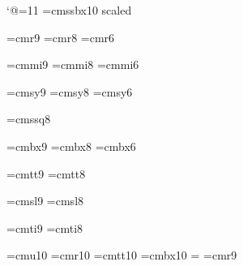 \catcode`@=11
\font\titlefont=cmssbx10 scaled 

\font\ninerm=cmr9
\font\eightrm=cmr8
\font\sixrm=cmr6

\font\ninei=cmmi9
\font\eighti=cmmi8
\font\sixi=cmmi6

\font\ninesy=cmsy9
\font\eightsy=cmsy8
\font\sixsy=cmsy6

\font\eightss=cmssq8


\font\ninebf=cmbx9
\font\eightbf=cmbx8
\font\sixbf=cmbx6

\font\ninett=cmtt9
\font\eighttt=cmtt8

\font\ninesl=cmsl9
\font\eightsl=cmsl8

\font\nineit=cmti9
\font\eightit=cmti8

\font\tenu=cmu10 %
\font\tenrm=cmr10
\font\tentt=cmtt10
\let\oldtenbf=\tenbf
\font\tenbf=cmbx10
\let\mainfont=\tenrm
{}=\tenrm
\let\oldninerm=\ninerm
\font\ninerm=cmr9
\newskip\ttglue
\def\tenpoint{\def\rm{\fam0\tenrm}%
  \textfont0=\tenrm \scriptfont0=\sevenrm \scriptscriptfont0=\fiverm
  \textfont1=\teni \scriptfont1=\seveni \scriptscriptfont1=\fivei
  \textfont2=\tensy \scriptfont2=\sevensy \scriptscriptfont2=\fivesy
  \textfont3=\tenex \scriptfont3=\tenex \scriptscriptfont3=\tenex
  \def\it{\fam\itfam\tenit}%
  \textfont\itfam=\tenit
  \def\sl{\fam\slfam\tensl}%
  \textfont\slfam=\tensl
  \def\bf{\fam\bffam\tenbf}%
  \textfont\bffam=\tenbf \scriptfont\bffam=\sevenbf
   \scriptscriptfont\bffam=\fivebf
  \def\tt{\fam\ttfam\tentt}%
  \textfont\ttfam=\tentt
  \tt \ttglue=.5em plus.25em minus.15em
  \normalbaselineskip=12pt
  \let\sc=\eightrm
  \let\big=\tenbig
  \setbox\strutbox=\hbox{\vrule height8.5pt depth3.5pt width\z@}%
  \normalbaselines\rm}
\def\eightpoint{\def\rm{\fam0\eightrm}%
  \textfont0=\eightrm \scriptfont0=\sixrm \scriptscriptfont0=\fiverm
  \textfont1=\eighti \scriptfont1=\sixi \scriptscriptfont1=\fivei
  \textfont2=\eightsy \scriptfont2=\sixsy \scriptscriptfont2=\fivesy
  \textfont3=\tenex \scriptfont3=\tenex \scriptscriptfont3=\tenex
  \def\it{\fam\itfam\eightit}%
  \textfont\itfam=\eightit
  \def\sl{\fam\slfam\eightsl}%
  \textfont\slfam=\eightsl
  \def\bf{\fam\bffam\eightbf}%
  \textfont\bffam=\eightbf \scriptfont\bffam=\sixbf
   \scriptscriptfont\bffam=\fivebf
  \def\tt{\fam\ttfam\eighttt}%
  \textfont\ttfam=\eighttt
  \tt \ttglue=.5em plus.25em minus.15em
  \normalbaselineskip=9pt
  \let\sc=\sixrm
  \let\big=\eightbig
  \setbox\strutbox=\hbox{\vrule height7pt depth2pt width\z@}%
  \normalbaselines\rm}
%
%
\def\tenmath{\tenpoint\fam-1 } %
\def\tenbig#1{{\hbox{$\left#1\vbox to8.5pt{}\right.\n@space$}}}
\def\ninebig#1{{\hbox{$\textfont0=\tenrm\textfont2=\tensy
  \left#1\vbox to7.25pt{}\right.\n@space$}}}
\def\eightbig#1{{\hbox{$\textfont0=\ninerm\textfont2=\ninesy
  \left#1\vbox to6.5pt{}\right.\n@space$}}}
%
%
\chardef{}
\def\ttverbatim{\begingroup
  \catcode`\\=\other
  \catcode`\{=\other
  \catcode`\}=\other
  \catcode`\$=\other
  \catcode`\&=\other
  \catcode`\#=\other
  \catcode`\%=\other
  \catcode`\~=\other
  \catcode`\_=\other
  \catcode`\^=\other
  \parskip=0pt
  \obeyspaces \obeylines \tt}

